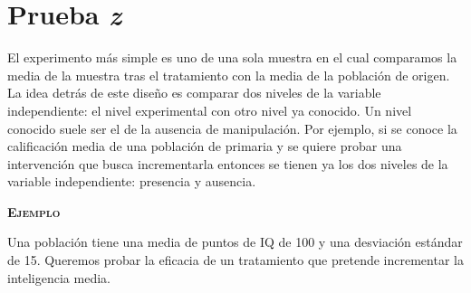 \documentclass[a4paper,12pt]{article}
\begin{document}
\begin{figure}[!ht]
  \begin{center}
  \end{center}
\end{figure}

\section{Prueba {\itshape z}}\label{pruebaz}

El experimento más simple es uno de una sola muestra en el cual comparamos la media de la muestra tras el tratamiento con la media de la población de origen.
La idea detrás de este diseño es comparar dos niveles de la variable independiente: el nivel experimental con otro nivel ya conocido. Un nivel conocido suele ser el de la ausencia de manipulación. Por ejemplo, si se conoce la calificación media de una población de primaria y se quiere probar una intervención que busca incrementarla entonces se tienen ya los dos niveles de la variable independiente: presencia y ausencia.

{\noindent\scshape\bfseries Ejemplo}

Una población tiene una media de puntos de IQ de 100 y una desviación estándar de 15. Queremos probar la eficacia de un tratamiento que pretende incrementar la inteligencia media.
\end{document}

